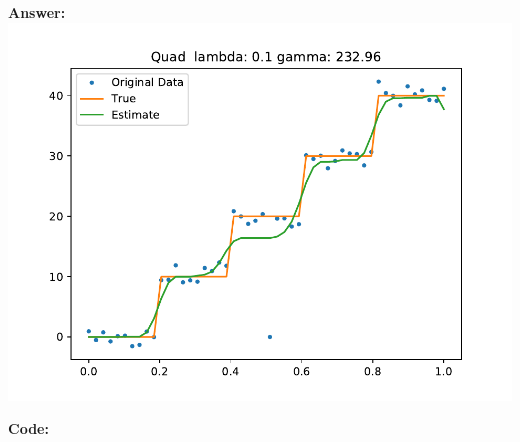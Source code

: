 \documentclass{article}
\newcommand{\1}{\mathbf{1}}
\begin{document}
\begin{enumerate}
\textbf{Answer:}\\
\includegraphics{2_quad.pdf}


\end{enumerate}
\textbf{Code:}
\end{document}
